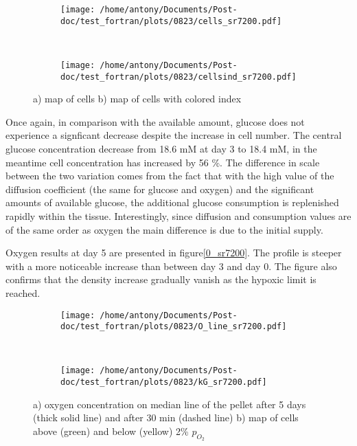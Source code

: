 \documentclass[11pt,a4paper]{article}
\begin{document}
\begin{figure}[ht!]
	\begin{subfigure}{0.45\textwidth}
	\centering
	\texttt{[image: /home/antony/Documents/Post-doc/test\_fortran/plots/0823/cells\_sr7200.pdf]}
	\caption{ }
	\end{subfigure}
	~~ \hspace{1cm}
	\begin{subfigure}{0.45\textwidth}
	\texttt{[image: /home/antony/Documents/Post-doc/test\_fortran/plots/0823/cellsind\_sr7200.pdf]}
		\caption{ }
	\end{subfigure}
	\caption{a) map of cells b) map of cells with colored index \label{cells_sr7200}}
	\end{figure}

Once again, in comparison with the available amount, glucose does not experience a signficant decrease despite the increase in cell number. The central glucose concentration decrease from 18.6 mM at day 3 to 18.4 mM, in the meantime cell concentration has increased by 56 \%. The difference in scale between the two variation comes from the fact that with the high value of the diffusion coefficient (the same for glucose and oxygen) and the significant amounts of available glucose, the additional glucose consumption is replenished rapidly within the tissue. Interestingly, since diffusion and consumption values are of the same order as oxygen the main difference is due to the initial supply.

Oxygen results at day 5 are presented in figure\ref{0_sr7200}. The profile is steeper with a more noticeable increase than between day 3 and day 0. The figure also confirms that the density increase gradually vanish as the hypoxic limit is reached. 

\begin{figure}[ht!]
	\begin{subfigure}{0.45\textwidth}
	\centering
	\texttt{[image: /home/antony/Documents/Post-doc/test\_fortran/plots/0823/O\_line\_sr7200.pdf]}
	\caption{ }
	\end{subfigure}
	~~ \hspace{1cm}
	\begin{subfigure}{0.45\textwidth}
	\texttt{[image: /home/antony/Documents/Post-doc/test\_fortran/plots/0823/kG\_sr7200.pdf]}
		\caption{ }
	\end{subfigure}
	\caption{a) oxygen concentration on median line of the pellet after 5 days (thick solid line) and after 30 min (dashed line) b) map of cells above (green) and below (yellow) 2\% $p_{O_2}$\label{O_sr7200}}
	\end{figure}
	
\end{document}

